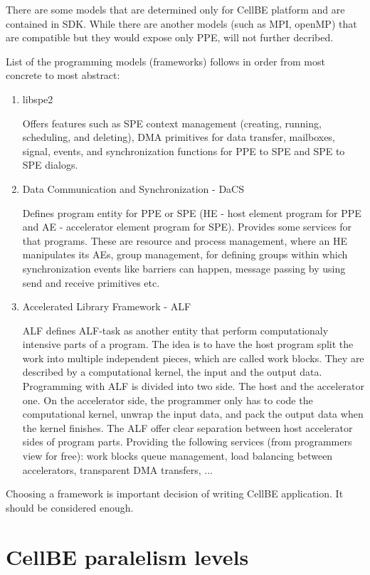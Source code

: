 There are some models that are determined only for CellBE platform and are contained in SDK.
 While there are another models (such as MPI, openMP) that are compatible but they would expose only PPE, will not further decribed.

List of the programming models (frameworks) follows in order from most concrete to most abstract:
\begin{enumerate}
\item {libspe2}
\par
Offers features such as SPE context management (creating, running, scheduling, and deleting), DMA primitives for data transfer, mailboxes, signal, events, and synchronization functions for PPE to SPE and SPE to SPE dialogs. 

\item {Data Communication and Synchronization - DaCS}
\par
Defines program entity for PPE or SPE (HE - host element program for PPE and AE - accelerator element program for SPE). Provides some services for that programs. These are resource and process management, where an HE manipulates its AEs, group management, for defining groups within which synchronization events like barriers can happen, message passing by using send and receive primitives etc.

\item {Accelerated Library Framework - ALF}
\par
ALF defines ALF-task as another entity that perform computationaly intensive parts of a program. The idea is to have the host program split the work into multiple independent pieces, which are called work blocks. They are described by a computational kernel, the input and the output data. Programming with ALF is divided into two side. The host and the accelerator one. On the accelerator side, the programmer only has to code the computational kernel, unwrap the input data, and pack the output data when the kernel finishes. The ALF offer clear separation between host accelerator sides of program parts. Providing the following services (from programmers view for free): work blocks queue management, load balancing between accelerators, transparent DMA transfers, ...

\end{enumerate}

Choosing a framework is important decision of writing CellBE application.
 It should be considered enough.

\section {CellBE paralelism levels}

